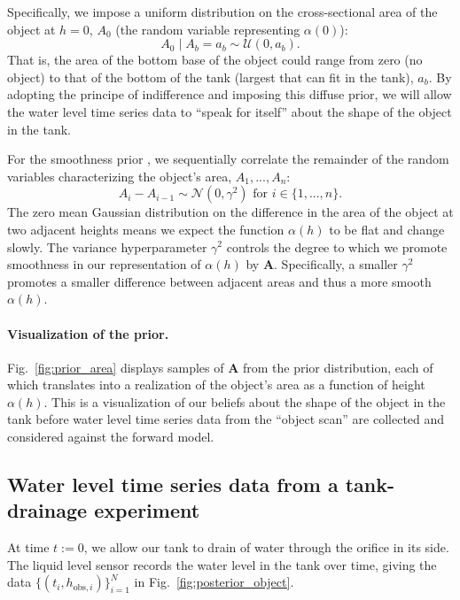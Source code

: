 \documentclass[openacc]{rsproca_new}%
\newcommand\thedata {$\{(t_i,h_{\text{obs}, i})\}_{i=1}^{N}$\xspace}
\begin{document}
Specifically, we impose a uniform distribution on the cross-sectional area of the object at $h=0$, $A_0$ (the random variable representing $\alpha(0)$):
\begin{equation}
	A_0 \mid A_b=a_b \sim \mathcal{U}(0, a_b).
\end{equation}
That is, the area of the bottom base of the object could range from zero (no object) to that of the bottom of the tank (largest that can fit in the tank), $a_b$. By adopting the principe of indifference and imposing this diffuse prior, we will allow the water level time series data to ``speak for itself'' about the shape of the object in the tank.

For the smoothness prior \cite{calvetti2018inverse}, we sequentially correlate the remainder of the random variables characterizing the object's area, $A_1, ..., A_n$: 
\begin{equation}
 A_i - A_{i-1} \sim \mathcal{N}(0, \gamma^2) \text{ for } i \in \{1, ..., n\}.
\end{equation} 
The zero mean Gaussian distribution on the difference in the area of the object at two adjacent heights means we expect the function $\alpha(h)$ to be flat and change slowly. 
The variance hyperparameter $\gamma^2$ controls the degree to which we promote smoothness in our representation of $\alpha(h)$ by $\mathbf{A}$. Specifically, a smaller $\gamma^2$ promotes a smaller difference between adjacent areas and thus a more smooth $\alpha(h)$. 

\paragraph{Visualization of the prior.}
Fig.~\ref{fig:prior_area} displays samples of $\mathbf{A}$ from the prior distribution, each of which translates into a realization of the object's area as a function of height $\alpha(h)$. This is a visualization of our beliefs about the shape of the object in the tank before water level time series data from the ``object scan'' are collected and considered against the forward model.

\subsection{Water level time series data from a tank-drainage experiment}
At time $t:=0$, we allow our tank to drain of water through the orifice in its side. The liquid level sensor records the water level in the tank over time, giving the data \thedata in Fig.~\ref{fig:posterior_object}.
\end{document}
